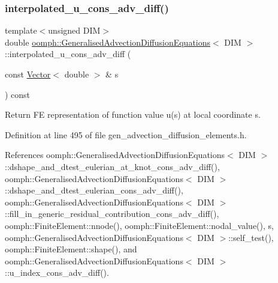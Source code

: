 \subsubsection{\texorpdfstring{interpolated\+\_\+u\+\_\+cons\+\_\+adv\+\_\+diff()}{interpolated\_u\_cons\_adv\_diff()}}
{\footnotesize\ttfamily template$<$unsigned D\+IM$>$ \\
double \hyperlink{classoomph_1_1GeneralisedAdvectionDiffusionEquations}{oomph\+::\+Generalised\+Advection\+Diffusion\+Equations}$<$ D\+IM $>$\+::interpolated\+\_\+u\+\_\+cons\+\_\+adv\+\_\+diff (\begin{DoxyParamCaption}\item[{const \hyperlink{classoomph_1_1Vector}{Vector}$<$ double $>$ \&}]{s }\end{DoxyParamCaption}) const\hspace{0.3cm}{\ttfamily [inline]}}



Return FE representation of function value u(s) at local coordinate s. 



Definition at line 495 of file gen\+\_\+advection\+\_\+diffusion\+\_\+elements.\+h.



References oomph\+::\+Generalised\+Advection\+Diffusion\+Equations$<$ D\+I\+M $>$\+::dshape\+\_\+and\+\_\+dtest\+\_\+eulerian\+\_\+at\+\_\+knot\+\_\+cons\+\_\+adv\+\_\+diff(), oomph\+::\+Generalised\+Advection\+Diffusion\+Equations$<$ D\+I\+M $>$\+::dshape\+\_\+and\+\_\+dtest\+\_\+eulerian\+\_\+cons\+\_\+adv\+\_\+diff(), oomph\+::\+Generalised\+Advection\+Diffusion\+Equations$<$ D\+I\+M $>$\+::fill\+\_\+in\+\_\+generic\+\_\+residual\+\_\+contribution\+\_\+cons\+\_\+adv\+\_\+diff(), oomph\+::\+Finite\+Element\+::nnode(), oomph\+::\+Finite\+Element\+::nodal\+\_\+value(), s, oomph\+::\+Generalised\+Advection\+Diffusion\+Equations$<$ D\+I\+M $>$\+::self\+\_\+test(), oomph\+::\+Finite\+Element\+::shape(), and oomph\+::\+Generalised\+Advection\+Diffusion\+Equations$<$ D\+I\+M $>$\+::u\+\_\+index\+\_\+cons\+\_\+adv\+\_\+diff().

\mbox{\label{classoomph_1_1GeneralisedAdvectionDiffusionEquations_aaaf6bd002cd50464a9e6087f8f58e65d}} 
